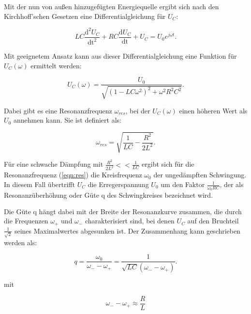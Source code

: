 \noindent
Mit der nun von außen hinzugefügten Energiequelle ergibt sich nach den Kirchhoff'schen Gesetzen eine Differentialgleichung für $U_C$:

\begin{equation}
LC \frac{\text{d}^2 U_C}{\text{dt}^2} + RC \frac{\text{d} U_C}{\text{dt}} + U_C = U_0 e^{j \omega t}.
\end{equation}

\noindent
Mit geeignetem Ansatz kann aus dieser Differentialgleichung eine Funktion für $U_C(\omega)$ ermittelt werden:

\begin{equation}
U_C(\omega) = \frac{U_0}{\sqrt{(1-LC\omega^2)^2 + \omega^2 R^2 C^2}}.
\label{eqn:uc}
\end{equation}

\noindent
Dabei gibt es eine Resonanzfrequenz $\omega_{res}$, bei der $U_C(\omega)$ einen höheren Wert als $U_0$ annehmen kann.
Sie ist definiert als:

\begin{equation}
\omega_{res} = \sqrt{\frac{1}{LC} - \frac{R^2}{2L^2}}.
\label{eqn:res}
\end{equation}

\noindent
Für eine schwache Dämpfung mit $\frac{R^2}{2L^2} << \frac{1}{LC}$ ergibt sich für die Resonanzfrequenz (\ref{eqn:res}) die Kreisfrequenz $\omega_0$ der ungedämpften Schwingung.
In diesem Fall übertrifft $U_C$ die Erregerspannung $U_0$ um den Faktor $\frac{1}{\omega_0 RC}$, 
der als Resonanzüberhöhung oder Güte q des Schwingkreises bezeichnet wird.

\noindent
Die Güte q hängt dabei mit der Breite der Resonanzkurve zusammen, 
die durch die Frequenzen $\omega_+$ und $\omega_-$ charakterisiert sind,
bei denen $U_C$ auf den Bruchteil $\frac{1}{\sqrt{2}}$ seines Maximalwertes abgesunken ist.
Der Zusammenhang kann geschrieben werden als:

\begin{equation}
q = \frac{\omega_0}{\omega_- - \omega_+}= \frac{1}{\sqrt{LC}(\omega_- - \omega_+)}.
\label{eqn:guete}
\end{equation}

\noindent
mit

\begin{equation}
    \omega_- - \omega_+ \approx \frac{R}{L}
    \label{eqn:wmp}
\end{equation}
 



